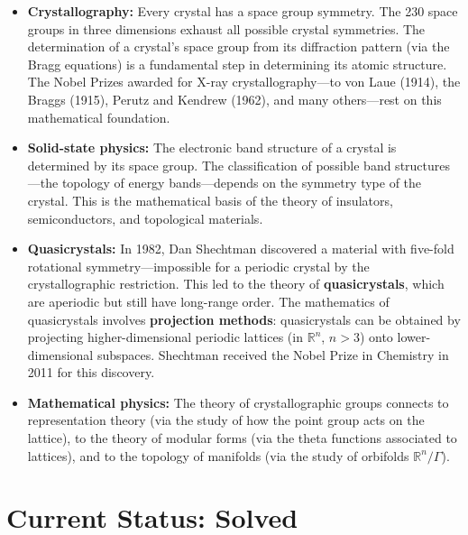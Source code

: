 \begin{itemize}
    \item \textbf{Crystallography:} Every crystal has a space group symmetry. The 230 space groups in three dimensions exhaust all possible crystal symmetries. The determination of a crystal's space group from its diffraction pattern (via the Bragg equations) is a fundamental step in determining its atomic structure. The Nobel Prizes awarded for X-ray crystallography---to von Laue (1914), the Braggs (1915), Perutz and Kendrew (1962), and many others---rest on this mathematical foundation.

    \item \textbf{Solid-state physics:} The electronic band structure of a crystal is determined by its space group. The classification of possible band structures---the topology of energy bands---depends on the symmetry type of the crystal. This is the mathematical basis of the theory of insulators, semiconductors, and topological materials.

    \item \textbf{Quasicrystals:} In 1982, Dan Shechtman discovered a material with five-fold rotational symmetry---impossible for a periodic crystal by the crystallographic restriction. This led to the theory of \textbf{quasicrystals}, which are aperiodic but still have long-range order. The mathematics of quasicrystals involves \textbf{projection methods}: quasicrystals can be obtained by projecting higher-dimensional periodic lattices (in $\mathbb{R}^n$, $n > 3$) onto lower-dimensional subspaces. Shechtman received the Nobel Prize in Chemistry in 2011 for this discovery.

    \item \textbf{Mathematical physics:} The theory of crystallographic groups connects to representation theory (via the study of how the point group acts on the lattice), to the theory of modular forms (via the theta functions associated to lattices), and to the topology of manifolds (via the study of orbifolds $\mathbb{R}^n / \Gamma$).
\end{itemize}

\section{Current Status: Solved}


